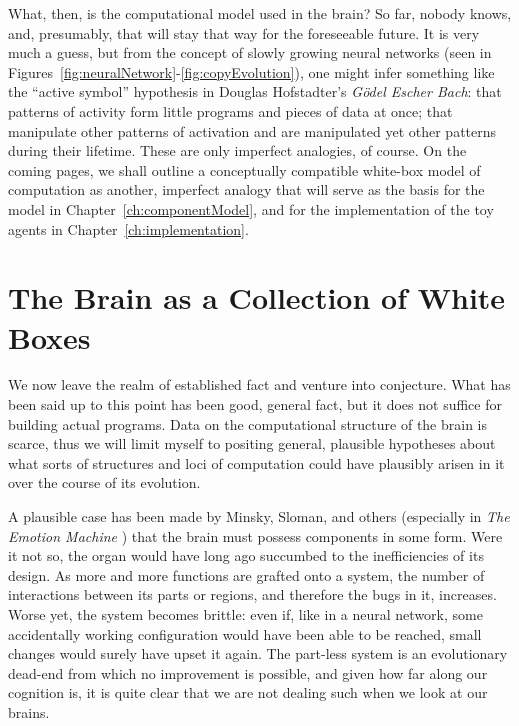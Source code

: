 What, then, is the computational model used in the brain? So far, nobody knows, and, presumably, that will stay that way for the foreseeable future. It is very much a guess, but from the concept of slowly growing neural networks (seen in Figures~\ref{fig:neuralNetwork}-\ref{fig:copyEvolution}), one might infer something like the ``active symbol'' hypothesis in Douglas Hofstadter's {\em G\"{o}del Escher Bach}: that patterns of activity form little programs and pieces of data at once; that manipulate other patterns of activation and are manipulated yet other patterns during their lifetime. These are only imperfect analogies, of course. On the coming pages, we shall outline a conceptually compatible white-box model of computation as another, imperfect analogy that will serve as the basis for the model in Chapter~\ref{ch:componentModel}, and for the implementation of the toy agents in Chapter~\ref{ch:implementation}.

\section{The Brain as a Collection of White Boxes}\label{sec:whiteBoxModel1}

We now leave the realm of established fact and venture into conjecture. What has been said up to this point has been good, general fact, but it does not suffice for building actual programs. Data on the computational structure of the brain is scarce, thus we will limit myself to positing general, plausible hypotheses about what sorts of structures and loci of computation could have plausibly arisen in it over the course of its evolution. 

A plausible case has been made by Minsky, Sloman, and others (especially in {\em The Emotion Machine} \cite{emotionMachine}) that the brain must possess components in some form. Were it not so, the organ would have long ago succumbed to the inefficiencies of its design. As more and more functions are grafted onto a system, the number of interactions between its parts or regions, and therefore the bugs in it, increases. Worse yet, the system becomes brittle: even if, like in a neural network, some accidentally working configuration would have been able to be reached, small changes would surely have upset it again. The part-less system is an evolutionary dead-end from which no improvement is possible, and given how far along our cognition is, it is quite clear that we are not dealing such when we look at our brains.

